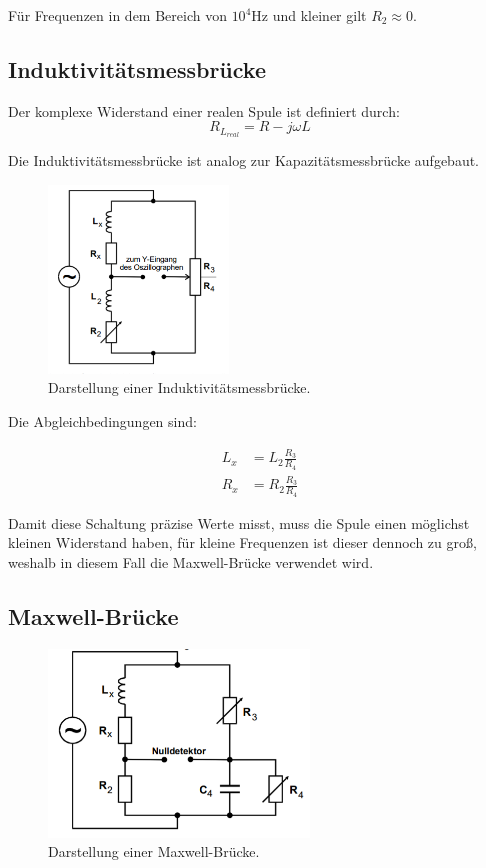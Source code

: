 Für Frequenzen in dem Bereich von $10^4$Hz und kleiner gilt $R_2 \approx 0$.


\subsection{Induktivitätsmessbrücke}
Der komplexe Widerstand einer realen Spule ist definiert durch:
\begin{equation}
  R_{L_{real}} = R - j \omega L
\end{equation}

Die Induktivitätsmessbrücke ist analog zur Kapazitätsmessbrücke aufgebaut.

\begin{figure}[H]
  \centering
  \includegraphics[height=5cm]{induktivitaet.PNG}
  \caption{Darstellung einer Induktivitätsmessbrücke. \cite{sample}}
  \label{fig:induktivitaet}
\end{figure}

Die Abgleichbedingungen sind:

\begin{align}
  L_x &= L_2 \frac{R_3}{R_4} \\
  R_x &= R_2 \frac{R_3}{R_4}
\end{align}

Damit diese Schaltung präzise Werte misst, muss die Spule einen möglichst kleinen Widerstand haben, für kleine Frequenzen
ist dieser dennoch zu groß, weshalb in diesem Fall die Maxwell-Brücke verwendet wird.

\subsection{Maxwell-Brücke}

\begin{figure}[H]
  \centering
  \includegraphics[height=5cm]{maxwell.PNG}
  \caption{Darstellung einer Maxwell-Brücke. \cite{sample}}
  \label{fig:maxwell}
\end{figure}

